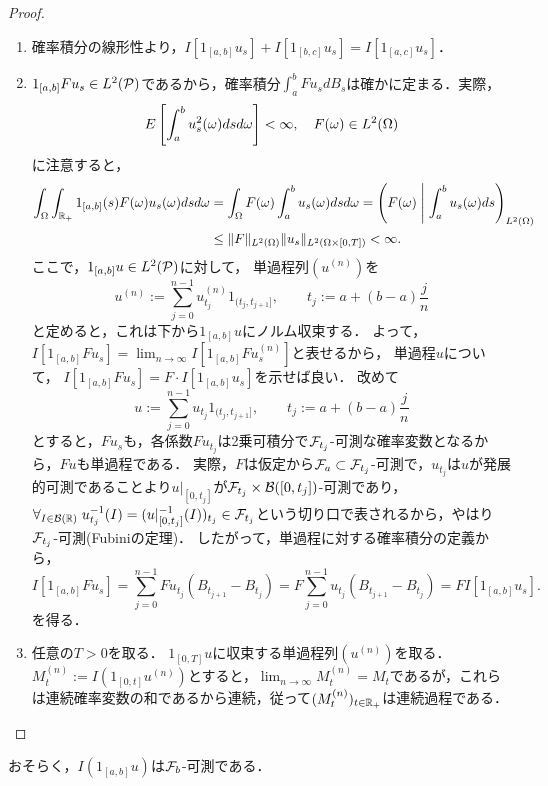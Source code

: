 \documentclass[uplatex,dvipdfmx]{jsreport}
\begin{document}
\begin{proof}\mbox{}
    \begin{enumerate}
        \item 確率積分の線形性より，$I[1_{[a,b]}u_s]+I[1_{[b,c]}u_s]=I[1_{[a,c]}u_s]$．
        \item $1_{[a,b]}Fu_s\in L^2(\P)$であるから，確率積分$\int^b_aFu_sdB_s$は確かに定まる．実際，
        \[E\Square{\int^b_au_s^2(\om)dsd\om}<\infty,\quad F(\om)\in L^2(\Om)\]
        に注意すると，
        \begin{align*}
            \int_\Om\int_{\R_+}1_{[a,b]}(s)F(\om)u_s(\om)dsd\om&=\int_\Om F(\om)\int^b_au_s(\om)dsd\om=\paren{F(\om)\;\middle|\;\int^b_au_s(\om)ds}_{L^2(\Om)}\\
            &\le\norm{F}_{L^2(\Om)}\norm{u_s}_{L^2(\Om\times[0,T])}<\infty.
        \end{align*}
        ここで，$1_{[a,b]}u\in L^2(\P)$に対して，
        単過程列$(u^{(n)})$を
        \[u^{(n)}:=\sum^{n-1}_{j=0}u^{(n)}_{t_j}1_{(t_j,t_{j+1}]},\qquad t_j:=a+(b-a)\frac{j}{n}\]
        と定めると，これは下から$1_{[a,b]}u$にノルム収束する．
        よって，$I[1_{[a,b]}Fu_s]=\lim_{n\to\infty}I[1_{[a,b]}Fu_s^{(n)}]$と表せるから，
        単過程$u$について，
        $I[1_{[a,b]}Fu_s]=F\cdot I[1_{[a,b]}u_s]$を示せば良い．
        改めて
        \[u:=\sum^{n-1}_{j=0}u_{t_j}1_{(t_j,t_{j+1}]},\qquad t_j:=a+(b-a)\frac{j}{n}\]
        とすると，$Fu_s$も，各係数$Fu_{t_j}$は2乗可積分で$\F_{t_j}$-可測な確率変数となるから，$Fu$も単過程である．
        実際，$F$は仮定から$\F_a\subset\F_{t_j}$-可測で，$u_{t_j}$は$u$が発展的可測であることより$u|_{[0,t_j]}$が$\F_{t_j}\times\B([0,t_j])$-可測であり，$\forall_{I\in\B(\R)}\;u_{t_j}^{-1}(I)=(u|_{[0,t_j]}^{-1}(I))_{t_j}\in\F_{t_j}$という切り口で表されるから，やはり$\F_{t_j}$-可測(Fubiniの定理)．
        したがって，単過程に対する確率積分の定義から，
        \[I[1_{[a,b]}Fu_s]=\sum^{n-1}_{j=0}Fu_{t_j}(B_{t_{j+1}}-B_{t_j})=F\sum^{n-1}_{j=0}u_{t_j}(B_{t_{j+1}}-B_{t_j})=FI[1_{[a,b]}u_s].\]
        を得る．
        \item 任意の$T>0$を取る．
        $1_{[0,T]}u$に収束する単過程列$(u^{(n)})$を取る．
        $M^{(n)}_t:=I(1_{[0,t]}u^{(n)})$とすると，$\lim_{n\to\infty}M^{(n)}_t=M_t$であるが，これらは連続確率変数の和であるから連続，従って$(M^{(n)}_t)_{t\in\R_+}$は連続過程である．

    \end{enumerate}
\end{proof}
\begin{remarks}
    おそらく，$I(1_{[a,b]}u)$は$\F_b$-可測である．
\end{remarks}
\end{document}
